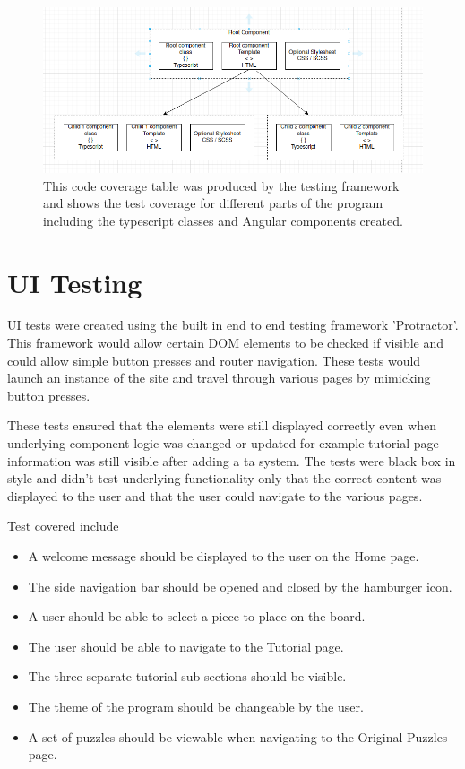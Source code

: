 \documentclass{l4proj}
\begin{document}
\begin{figure}
    \centering
    \includegraphics[width=1\linewidth]{images/codeCoverage.png}
    
    \caption{This code coverage table was produced by the testing framework and shows the test coverage for different parts of the program including the typescript classes and Angular components created.}
    
    \label{fig:codeCoverage}
\end{figure}

\section{UI Testing}
UI tests were created using the built in end to end testing framework 'Protractor'. This framework would allow certain DOM elements to be checked if visible and could allow simple button presses and router navigation. These tests would launch an instance of the site and travel through various pages by mimicking button presses. 

These tests ensured that the elements were still displayed correctly even when underlying component logic was changed or updated for example tutorial page information was still visible after adding a ta system. The tests were black box in style and didn't test underlying functionality only that the correct content was displayed to the user and that the user could navigate to the various pages. 

Test covered include 
\begin{itemize}
    \item A welcome message should be displayed to the user on the Home page.
    \item The side navigation bar should be opened and closed by the hamburger icon.
    \item A user should be able to select a piece to place on the board.
    \item The user should be able to navigate to the Tutorial page.
    \item The three separate tutorial sub sections should be visible.
    \item The theme of the program should be changeable by the user.
    \item A set of puzzles should be viewable when navigating to the Original Puzzles page.
\end{itemize}
\end{document}

